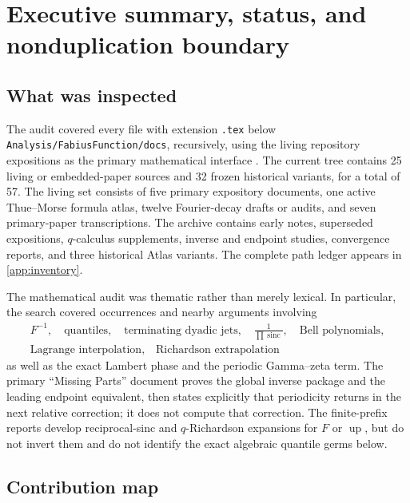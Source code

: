 \documentclass[11pt,oneside]{article}
\numberwithin{equation}{section}
\theoremstyle{definition}
\theoremstyle{remark}
\newcommand{\Up}{\operatorname{up}}
\newcommand{\sinc}{\operatorname{sinc}}
\newcommand{\repo}{\nolinkurl{Analysis/FabiusFunction/docs}}
\begin{document}
\tableofcontents
\newpage

\section{Executive summary, status, and nonduplication boundary}
\label{sec:executive}

\subsection{What was inspected}

The audit covered every file with extension \texttt{.tex} below \repo{}, recursively, using the living repository expositions as the primary mathematical interface \cite{ProveItPrimary,ProveItMissing,ProveItAtlas,ProveItFrontiers}.
The current tree contains 25 living or embedded-paper sources and 32 frozen historical
variants, for a total of 57.  The living set consists of five primary expository documents,
one active Thue--Morse formula atlas, twelve Fourier-decay drafts or audits, and seven
primary-paper transcriptions.  The archive contains early notes, superseded expositions,
$q$-calculus supplements, inverse and endpoint studies, convergence reports, and three
historical Atlas variants.  The complete path ledger appears in \cref{app:inventory}.

The mathematical audit was thematic rather than merely lexical.  In particular, the search
covered occurrences and nearby arguments involving
\[
 \begin{gathered}
 F^{-1},\quad \text{quantiles},\quad \text{terminating dyadic jets},\quad
 \frac1{\prod\sinc},\quad \text{Bell polynomials},\\
 \text{Lagrange interpolation},\quad \text{Richardson extrapolation}
 \end{gathered}
\]
as well as the exact Lambert phase and the periodic Gamma--zeta term.  The primary
``Missing Parts'' document proves the global inverse package and the leading endpoint
equivalent, then states explicitly that periodicity returns in the next relative correction;
it does not compute that correction.  The finite-prefix reports develop reciprocal-sinc and
$q$-Richardson expansions for $F$ or $\Up$, but do not invert them and do not identify the
exact algebraic quantile germs below.

\subsection{Contribution map}
\end{document}
